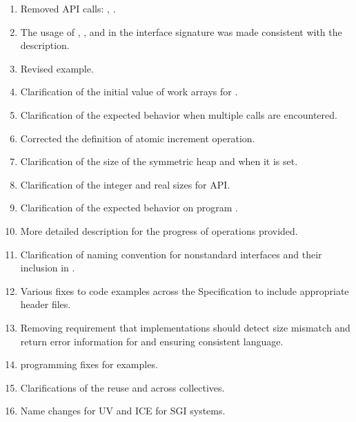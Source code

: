 \begin{enumerate}
%
%
\item Removed \ac{API} calls: ,
      .
%
%
\item The usage of , , and  in the
      interface signature was made consistent with the description.
%
%
\item Revised  example.
%
%
\item Clarification of the initial value of  work arrays for
.
%
%
\item Clarification of the expected behavior when multiple 
calls are encountered.
%
%
\item Corrected the definition of atomic increment operation.
%
%
\item Clarification of the size of the symmetric heap and when it is set.
%
%
\item Clarification of the integer and real sizes for \Fortran \ac{API}.
%
%
\item Clarification of the expected behavior on program .
%
%
\item More detailed description for the progress of \openshmem operations
provided.
%
%
\item Clarification of naming convention for nonstandard interfaces and their
inclusion in .
%
%
\item Various fixes to \openshmem code examples across the Specification to
include appropriate header files.
%
\item Removing requirement that implementations should detect size mismatch and
return error information for  and ensuring consistent
language.
%
%
\item \Fortran programming fixes for examples.
%
%
\item Clarifications of the reuse  and  across
collectives.
%
%
\item Name changes for UV and ICE for \ac{SGI} systems.
%
%
\end{enumerate}

